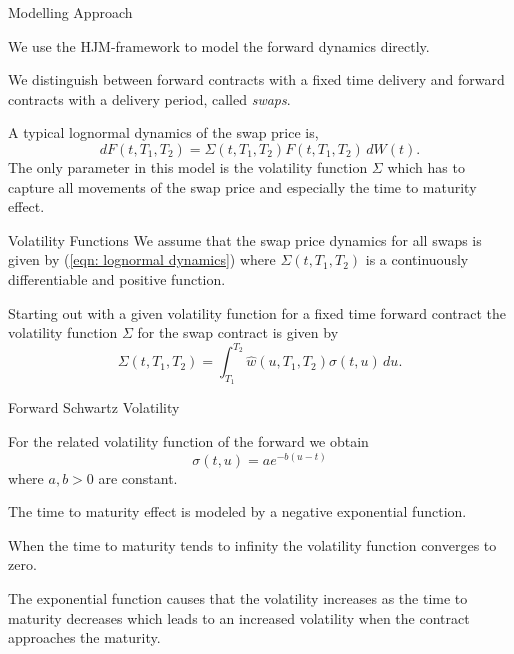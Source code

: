 
{Modelling Approach}


	We use the HJM-framework to model the forward dynamics directly.

	We distinguish between forward contracts with a fixed time delivery and forward contracts with a delivery period, called \emph{swaps}.

	A typical lognormal dynamics of the swap price is,
\begin{equation}
dF(t,T_1,T_2)=\Sigma(t,T_1,T_2)F(t,T_1,T_2)\, dW(t). \label{eqn: lognormal dynamics}
\end{equation}
The only parameter in this model is the volatility function $\Sigma$ which has to capture all movements of the swap price and especially the time to maturity effect.


{Volatility Functions}
We assume that the swap price dynamics for all swaps is given by (\ref{eqn: lognormal dynamics})
where $\Sigma(t,T_1,T_2)$ is a continuously differentiable and positive function.

Starting out with a given volatility function for a fixed time forward contract the volatility function $\Sigma$ for the swap contract is given by
\begin{equation}
\Sigma(t,T_1,T_2)=\int_{T_1}^{T_2} \hat{w}(u,T_1,T_2) \sigma(t,u) \, du. \label{eqn: swap volatility creation}
\end{equation}

{Forward Schwartz Volatility}


	For the related volatility function of the forward we obtain
\begin{equation}\label{vol-schwartz}
\sigma(t,u)=a e^{-b(u-t)}
\end{equation}
where $a,b >0 $ are constant.

	The time to maturity effect is modeled by a negative exponential function.


	When the time to maturity tends to infinity the volatility function converges to zero.

	The exponential function causes that the volatility increases as the time to maturity decreases which leads to an increased volatility when the contract approaches the maturity.


